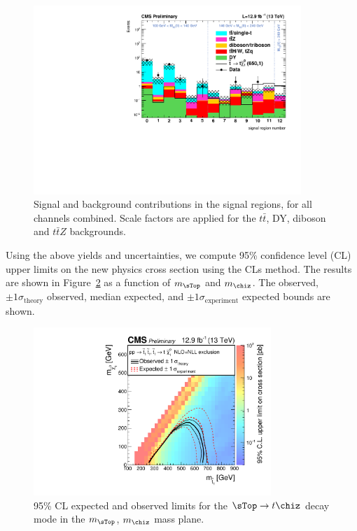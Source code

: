   \begin{figure}
    \centering
    \includegraphics[width=0.9\textwidth]{figures/regions80X/DY-DD/TTZ-DD-Top16009/TTJets-DD/multiBoson-DD/all_bkgs.pdf}
    \caption{Signal and background contributions in the signal regions, for all channels combined. Scale factors are applied for the $t\bar{t}$, DY, diboson and $t\bar{t}Z$ backgrounds.}
    \label{fig:signalRegions-all}
  \end{figure}

  Using the above yields and uncertainties, we compute 95\% confidence level (CL) upper limits on the new physics cross section using the CLs method.
  The results are shown in Figure~\ref{fig:limit} as a function of $m_{\sTop}$ and $m_{\chiz}$. The observed, $\pm 1 \sigma_\text{theory}$ observed, median expected, and  $\pm 1 \sigma_\text{experiment}$ expected
  bounds are shown.

  \begin{figure}
    \centering
    \includegraphics[width=0.8\textwidth]{figures/limit/limitXSEC.pdf}
    \caption{95\% CL expected and observed limits for the $\sTop \to t\chiz$ decay mode in the $m_{\sTop}$, $m_{\chiz}$ mass plane.}
    \label{fig:limit}
  \end{figure}

  
